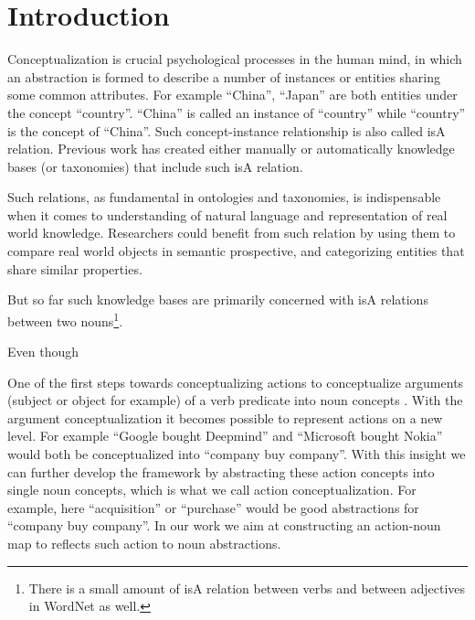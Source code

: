 \section{Introduction}

Conceptualization is crucial psychological processes in the human mind,
in which an abstraction is formed to describe a number of instances
or entities sharing some common attributes.
For example ``China'', ``Japan'' are both entities under the concept ``country''.
``China'' is called an instance of ``country'' while ``country'' is the concept
of ``China''. Such concept-instance relationship is also called isA relation.
Previous work \cite{wordnet,probase} has created either manually or automatically
knowledge bases (or taxonomies) that include such isA relation.

Such relations, as fundamental in ontologies and taxonomies, is indispensable when it
comes to understanding of natural language and representation of real world knowledge.
Researchers could benefit from such relation by using them to compare real world objects
in semantic prospective, and categorizing entities that share similar properties.

But so far such
knowledge bases are primarily concerned with isA relations between two nouns\footnote{There is a
small amount of isA relation between verbs and between adjectives in WordNet as well.}.

Even though

One of the first steps towards conceptualizing actions to conceptualize
arguments (subject or object for example) of a verb predicate into noun concepts \cite{action}.
With the argument conceptualization it becomes possible to
represent actions on a new level. For example ``Google bought Deepmind'' and
``Microsoft bought Nokia'' would both be conceptualized into ``company buy company''.
With this insight we can further develop the
framework by abstracting these action concepts into single noun concepts,
which is what we call action conceptualization. For example,
here ``acquisition'' or ``purchase'' would be good abstractions for ``company buy company''.
In our work we aim at constructing
an action-noun map to reflects such action to noun abstractions.


